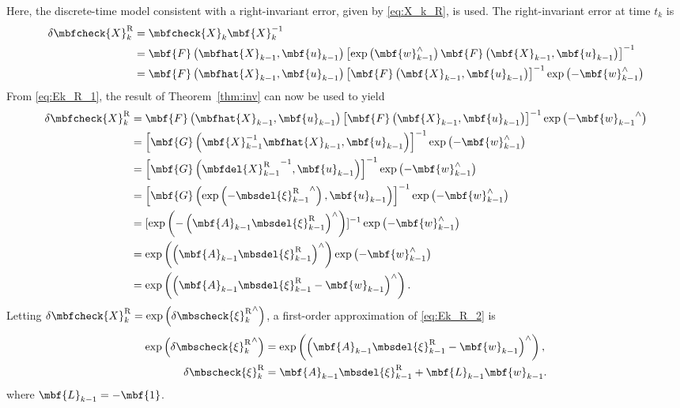 Here, the discrete-time model consistent with a right-invariant error, given by \eqref{eq:X_k_R}, is used. The right-invariant error at time $t_k$ is 
\begin{align}
	\delta \mbfcheck{X}_k^\mathrm{R} & = \mbfcheck{X}_k \mbf{X}_k^{-1} \notag \\
	& = \mbf{F}\left(\mbfhat{X}_{k-1},\mbf{u}_{k-1}\right)\left[\exp\left(\mbf{w}_{k-1}^\wedge\right)\mbf{F}\left(\mbf{X}_{k-1},\mbf{u}_{k-1}\right)\right]^{-1} \notag \\
	& = \mbf{F}\left(\mbfhat{X}_{k-1},\mbf{u}_{k-1}\right)\left[\mbf{F}\left(\mbf{X}_{k-1},\mbf{u}_{k-1}\right)\right]^{-1}\exp\left(-\mbf{w}_{k-1}^\wedge\right) \label{eq:Ek_R_1}
\end{align}
From \eqref{eq:Ek_R_1}, the result of Theorem~\ref{thm:inv} can now be used to yield
\begin{align}
	\delta \mbfcheck{X}_k^\mathrm{R} & =\mbf{F}\left(\mbfhat{X}_{k-1},\mbf{u}_{k-1}\right)\left[\mbf{F}\left(\mbf{X}_{k-1},\mbf{u}_{k-1}\right)\right]^{-1}\exp\left(-{\mbf{w}_{k-1}}^\wedge\right)  \notag \\
	& = \left[\mbf{G}\left(\mbf{X}_{k-1}^{-1}\mbfhat{X}_{k-1},\mbf{u}_{k-1}\right)\right]^{-1}\exp\left(-\mbf{w}_{k-1}^\wedge\right) \notag \\ 
	& = \left[\mbf{G}\left({\mbfdel{X}_{k-1}^\mathrm{R}}^{-1},\mbf{u}_{k-1}\right)\right]^{-1}\exp\left(-\mbf{w}_{k-1}^\wedge\right)\notag \\
	& = \left[\mbf{G}\left(\exp\left(-{\mbsdel{\xi}_{k-1}^\mathrm{R}}^\wedge\right),\mbf{u}_{k-1}\right)\right]^{-1}\exp\left(-\mbf{w}_{k-1}^\wedge\right) \notag \\ 
	& = [\exp\left(-\left(\mbf{A}_{k-1}\mbsdel{\xi}_{k-1}^\mathrm{R}\right)^\wedge\right)]^{-1}\exp\left(-\mbf{w}_{k-1}^\wedge\right)\notag \\ 
	& = \exp\left(\left(\mbf{A}_{k-1}\mbsdel{\xi}_{k-1}^\mathrm{R}\right)^\wedge\right)\exp\left(-\mbf{w}_{k-1}^\wedge\right) \notag \\
	& = \exp\left(\left(\mbf{A}_{k-1}\mbsdel{\xi}_{k-1}^\mathrm{R}- \mbf{w}_{k-1}\right)^\wedge\right).\label{eq:Ek_R_2}
\end{align}
Letting $\delta \mbfcheck{X}_k^\mathrm{R} = \exp\left(\delta {\mbscheck{\xi}_k^\mathrm{R}}^\wedge\right)$, a first-order approximation of \eqref{eq:Ek_R_2} is
\begin{align}
	\exp\left({\delta \mbscheck{\xi}_k^\mathrm{R}}^\wedge\right) & = \exp\left(\left(\mbf{A}_{k-1}\mbsdel{\xi}_{k-1}^\mathrm{R}  - \mbf{w}_{k-1} \right)^\wedge\right), \notag \\
	\delta \mbscheck{\xi}_k^\mathrm{R} & = \mbf{A}_{k-1}\mbsdel{\xi}_{k-1}^\mathrm{R} + \mbf{L}_{k-1}\mbf{w}_{k-1}. \notag
\end{align}
where $\mbf{L}_{k-1} = -\mbf{1}$.


